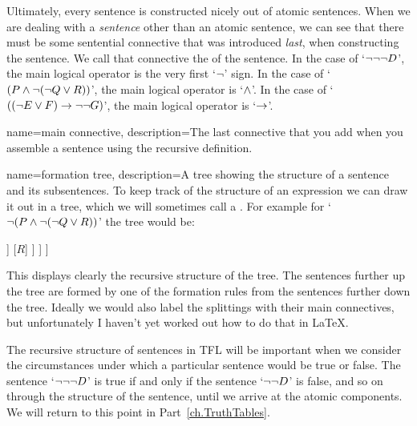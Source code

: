 Ultimately, every sentence is constructed nicely out of atomic sentences. When we are dealing with a \emph{sentence} other than an atomic sentence, we can see that there must be some sentential connective that was introduced \emph{last}, when constructing the sentence. We call that connective the  of the sentence. In the case of `$\neg\neg\neg D$', the main logical operator is the very first `$\neg$' sign. In the case of `$(P \eand \enot (\enot Q \eor R))$', the main logical operator is `$\wedge$'. In the case of `$((\neg E \vee F) \rightarrow \neg\neg G)$', the main logical operator is `$\rightarrow$'.

{
	name=main connective,
	description={The last connective that you add when you assemble a sentence using the recursive definition.}
}

{
	name=formation tree,
	description={A tree showing the structure of a sentence and its subsentences.}
}
To keep track of the structure of an expression we can draw it out in a tree, which we will sometimes call a . For example for `$\enot (P \eand \enot (\enot Q \eor R))$' the tree would be:
\label{S:formationtree}

\begin{center}
\begin{forest}
	[$\enot (P \eand \enot (\enot Q \eor R))$
		[$(P \eand \enot (\enot Q \eor R))$
			[$P$]
			[$\enot (\enot Q\eor R)$
				[$\enot Q$
					[$Q$]
				]
				[$R$]
			]
		]
	]
\end{forest}
\end{center}

This displays clearly the recursive structure of the tree. The sentences further up the tree are formed by one of the formation rules from the sentences further down the tree. Ideally we would also label the splittings with their main connectives, but unfortunately I haven't yet worked out how to do that in \LaTeX.



The recursive structure of sentences in TFL will be important when we consider the circumstances under which a particular sentence would be true or false. The sentence `$\neg \neg \neg D$' is true if and only if the sentence `$\neg \neg D$' is false, and so on through the structure of the sentence, until we arrive at the atomic components. We will return to this point in Part~\ref{ch.TruthTables}.




